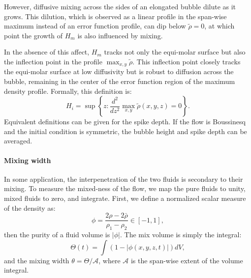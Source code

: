 However, diffusive mixing across the sides of an elongated bubble dilute as it grows.
This dilution, which is observed as a linear profile in the span-wise maximum instead of an error function profile, can dip below $\tilde\rho = 0$, at which point the growth of $H_m$ is also influenced by mixing.

In the absence of this affect, $H_{m}$ tracks not only the equi-molar surface but also the inflection point in the profile $\max_{x,y} \tilde \rho$.
This inflection point closely tracks the equi-molar surface at low diffusivity but is robust to diffusion across the bubble, remaining in the center of the error function region of the maximum density profile.
Formally, this definition is:
\begin{equation}
H_i = \sup \left\{z : \frac{d^2}{dz^2} \max_{x,y} \tilde\rho(x,y,z) = 0 \right\}.
\end{equation}
Equivalent definitions can be given for the spike depth.
If the flow is Boussinesq and the initial condition is symmetric, the bubble height and spike depth can be averaged.

\paragraph{Mixing width}

In some application, the interpenetration of the two fluids is secondary to their mixing.
To measure the mixed-ness of the flow, we map the pure fluids to unity, mixed fluids to zero, and integrate.
First, we define a normalized scalar measure of the density as:
\begin{equation}
\phi = \frac{2\rho - 2\bar\rho}{\rho_1 - \rho_2} \in \left[-1,1\right],
\end{equation}
then the purity of a fluid volume is $|\phi|$.
The mix volume is simply the integral:
\begin{equation}
\Theta(t) = \int \left(1 - \left|\phi(x,y,z,t)\right|\right) dV,
\end{equation}
and the mixing width $\theta = \Theta / \mathcal{A}$, where $\mathcal{A}$ is the span-wise extent of the volume integral.

